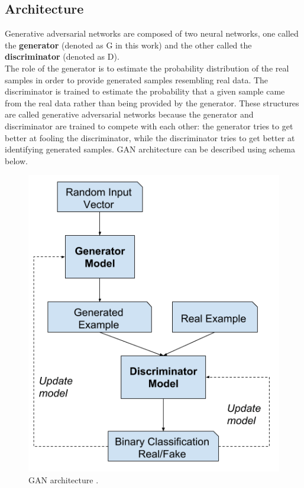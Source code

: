 \documentclass[12pt,a4paper,openany]{book}
\begin{document}
\subsection{Architecture}
\noindent Generative adversarial networks are composed of two neural networks, one called the \textbf{generator} (denoted as G in this work) and the other called the \textbf{discriminator} (denoted as D). \\
\noindent The role of the generator is to estimate the probability distribution of the real samples in order to provide generated samples resembling real data. The discriminator is trained to estimate the probability that a given sample came from the real data rather than being provided by the generator.
\noindent These structures are called generative adversarial networks because the generator and discriminator are trained to compete with each other: the generator tries to get better at fooling the discriminator, while the discriminator tries to get better at identifying generated samples.  GAN architecture can be described using schema below.
 \begin{figure}[H]
     \centering
     \includegraphics[scale=0.3]{figs/gan_architecture.png}
     \caption{GAN architecture \cite{gan_arch}.}
 \end{figure}
\end{document}
